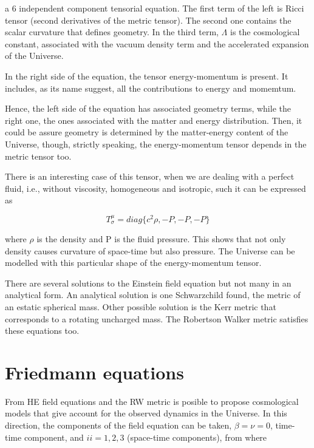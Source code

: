 
a 6 independent component tensorial equation. The first term of the left
is Ricci tensor (second derivatives of the metric tensor). 
The second one contains the scalar curvature that defines geometry. 
In the third term, $\Lambda$ is the cosmological constant, associated with
the vacuum density term and the accelerated expansion of the Universe.  

In the right side of the equation, the tensor energy-momentum is present.
It includes, as its name suggest, all the contributions to energy and momemtum. 

Hence, the left side of the equation has associated geometry terms, 
while the right one, the ones associated with the matter and energy distribution. 
Then, it could be assure geometry is determined by the matter-energy content 
of the Universe, though, strictly speaking, the energy-momentum tensor depends
in the metric tensor too. 

There is an interesting case of this tensor, when we are dealing with a perfect 
fluid, i.e., without viscosity, homogeneous and isotropic, such it can be expressed
as 

\[T^{\mu}_{\sigma}= diag\{c^2\rho,-P,-P,-P\}\]

where $\rho$ is the density and P is the fluid pressure. 
This shows that not only density causes curvature of space-time 
but also pressure. The Universe can be modelled with this particular
shape of the energy-momentum tensor. 

There are several solutions to the Einstein field equation but not
many in an analytical form. An analytical solution is one Schwarzchild found,
the metric of an estatic spherical mass. Other possible solution is the Kerr 
metric that corresponds to a rotating uncharged mass. The Robertson
Walker metric satisfies these equations too. 
	

\section{ Friedmann equations }


From HE field equations and the RW metric is posible to propose 
cosmological models that give account for the observed dynamics
in the Universe. In this direction, the components of the 
field equation can be taken, $\beta=\nu= 0$, time-time component,
and $ii=1,2,3$ (space-time components), from where

